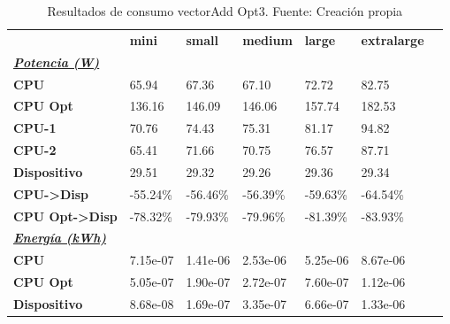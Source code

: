 \begin{table}[H]
    \centering
    \begin{tabular}{lllllll}
    \rowcolor[HTML]{DAE8FC} \ & \textbf{mini} & \textbf{small} & \textbf{medium} & \textbf{	large} & \textbf{	extralarge} \\
    \cellcolor[HTML]{DAE8FC} \textbf{\textbf{{\emph{{\underline{{Potencia (W)}}}}}}} &  &  &  & 	 & 	 \\
    \rowcolor[HTML]{EFEFEF} \cellcolor[HTML]{DAE8FC} \textbf{CPU} & 65.94 & 67.36 & 67.10 & 	72.72 & 	82.75 \\
    \cellcolor[HTML]{DAE8FC} \textbf{CPU Opt} & 136.16 & 146.09 & 146.06 & 	157.74 & 	182.53 \\
    \rowcolor[HTML]{EFEFEF} \cellcolor[HTML]{DAE8FC} \textbf{\quad CPU-1} & 70.76 & 74.43 & 75.31 & 	81.17 & 	94.82 \\
    \cellcolor[HTML]{DAE8FC} \textbf{\quad CPU-2} & 65.41 & 71.66 & 70.75 & 	76.57 & 	87.71 \\
    \rowcolor[HTML]{EFEFEF} \cellcolor[HTML]{DAE8FC} \textbf{Dispositivo} & 29.51 & 29.32 & 29.26 & 	29.36 & 	29.34 \\
    \cellcolor[HTML]{DAE8FC} \textbf{CPU->Disp} & -55.24\% & -56.46\% & -56.39\% & 	-59.63\% & 	-64.54\% \\
    \rowcolor[HTML]{EFEFEF} \cellcolor[HTML]{DAE8FC} \textbf{CPU Opt->Disp} & -78.32\% & -79.93\% & -79.96\% & 	-81.39\% & 	-83.93\% \\
    \cellcolor[HTML]{DAE8FC} \textbf{\textbf{{\emph{{\underline{{Energía (kWh)}}}}}}} &  &  &  & 	 & 	 \\
    \rowcolor[HTML]{EFEFEF} \cellcolor[HTML]{DAE8FC} \textbf{CPU} & 7.15e-07 & 1.41e-06 & 2.53e-06 & 	5.25e-06 & 	8.67e-06 \\
    \cellcolor[HTML]{DAE8FC} \textbf{CPU Opt} & 5.05e-07 & 1.90e-07 & 2.72e-07 & 	7.60e-07 & 	1.12e-06 \\
    \rowcolor[HTML]{EFEFEF} \cellcolor[HTML]{DAE8FC} \textbf{Dispositivo} & 8.68e-08 & 1.69e-07 & 3.35e-07 & 	6.66e-07 & 	1.33e-06 \\
    \end{tabular}
    \caption[Resultados de consumo vectorAdd Opt3]{{Resultados de consumo vectorAdd Opt3. Fuente: Creación propia}}
    \label{table_test_vectorAdd_Opt3_hw_powerResults}
\end{table}